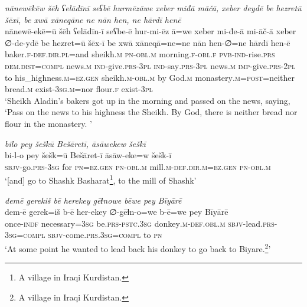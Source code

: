 \ea \label{HB.2}
\textit{nānewēkēw šēh ʕelādīnī seʕbē hurmēzāwe xeber miđā māčā, xeber deydē be hezretū šēxī, be xwā xāneqāne ne nān hen, ne hārdī henē} \\ 
\gll nānewē-ekē=ū šēh ʕelādīn-ī seʕbe-ē hur-mi-ēz ā=we xeber mi-đe-ā mi-āč-ā xeber ∅-de-ydē be hezret=ū šēx-ī be xwā xāneqā=ne=ne nān hen-∅=ne hārdī hen-ē \\ 
 baker\textsc{\textsc{.f}}\textsc{-def}\textsc{.dir}\textsc{.pl}=and sheikh\textsc{.m} \textsc{pn}\textsc{-obl}\textsc{.m} morning\textsc{\textsc{.f}}\textsc{-obl}\textsc{\textsc{.f}} \textsc{pvb-}\textsc{ind-}rise\textsc{.prs} \textsc{dem.dist}\textsc{=compl} news\textsc{.m} \textsc{ind-}give\textsc{.prs}\textsc{-3pl} \textsc{ind-}say\textsc{.prs}\textsc{-3pl} news\textsc{.m} \textsc{imp-}give\textsc{.prs}\textsc{-2pl} to his\_highness\textsc{.m}\textsc{=ez}\textsc{.gen} sheikh\textsc{.m}\textsc{-obl}\textsc{.m} by God\textsc{.m} monastery\textsc{.m}\textsc{=\textsc{post}}=neither bread\textsc{.m} exist\textsc{-3sg}\textsc{.m}=nor flour\textsc{\textsc{.f}} exist\textsc{-3pl} \\ 
\glt `Sheikh Aladin’s bakers got up in the morning and passed on the news, saying, ‘Pass on the news to his highness the Sheikh. By God, there is neither bread nor flour in the monastery. '
\z 
 
\ea \label{HB.12}
\textit{bilo pey šeškū Bešāretī, āsāwekew šeškī} \\ 
\gll bi-l-o pey šešk=ū Bešāret-ī āsāw-eke=w šešk-ī \\ 
 \textsc{sbjv-}go\textsc{.prs}\textsc{-3sg} for \textsc{pn}\textsc{=ez}\textsc{.gen} \textsc{pn}\textsc{-obl}\textsc{.m} mill\textsc{.m}\textsc{-def}\textsc{.dir}\textsc{.m}\textsc{=ez}\textsc{.gen} \textsc{pn}\textsc{-obl}\textsc{.m} \\ 
\glt `[and] go to Shashk Basharat\footnote{A village in Iraqi Kurdistan.}, to the mill of Shashk'
\z 
 
\ea \label{HB.25}
\textit{demē gerekiš bē herekey gēɫnowe bēwe pey Bīyārē} \\ 
\gll dem-ē gerek=iš b-ē her-ekey ∅-gēɫn-o=we b-ē=we pey Bīyārē \\ 
 once\textsc{-indf} necessary\textsc{=3sg} be\textsc{.prs}\textsc{-pstc}\textsc{.3sg} donkey\textsc{.m}\textsc{-def}\textsc{.obl}\textsc{.m} \textsc{sbjv-}lead\textsc{.prs}\textsc{-3sg}\textsc{=\textsc{compl}} \textsc{sbjv-}come\textsc{.prs}\textsc{.3sg}\textsc{=\textsc{compl}} to \textsc{pn} \\ 
\glt `At some point he wanted to lead back his donkey to go back to Biyare.\footnote{A village in Iraqi Kurdistan.}'
\z 
 
